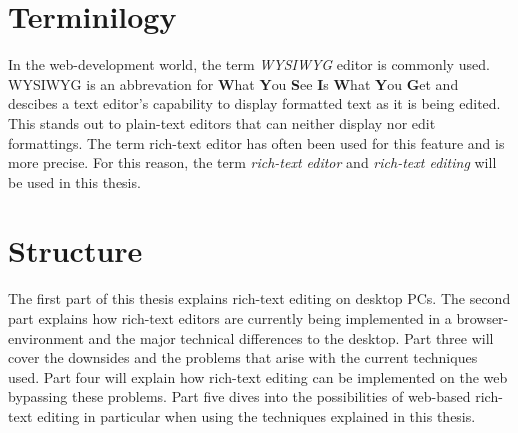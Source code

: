 \section{Terminilogy}

In the web-development world, the term \textit{WYSIWYG} editor is commonly used. WYSIWYG is an abbrevation for \textbf{W}hat \textbf{Y}ou \textbf{S}ee \textbf{I}s \textbf{W}hat \textbf{Y}ou \textbf{G}et and descibes a text editor's capability to display formatted text as it is being edited. This stands out to plain-text editors that can neither display nor edit formattings. The term rich-text editor has often been used for this feature and is more precise. For this reason, the term \textit{rich-text editor} and \textit{rich-text editing} will be used in this thesis.


\section{Structure}

The first part of this thesis explains rich-text editing on desktop PCs. The second part explains how rich-text editors are currently being implemented in a browser-environment and the major technical differences to the desktop. Part three will cover the downsides and the problems that arise with the current techniques used. Part four will explain how rich-text editing can be implemented on the web bypassing these problems. Part five dives into the possibilities of web-based rich-text editing in particular when using the techniques explained in this thesis.


